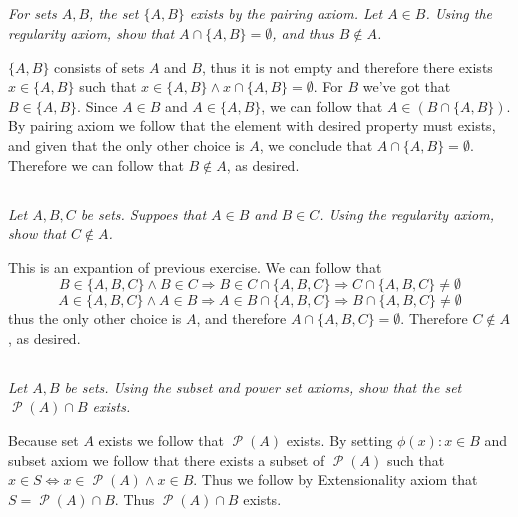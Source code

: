 \documentclass[11pt,oneside,titlepage]{book}
\DeclareMathOperator \pow {\mathcal {P}}
\DeclareMathOperator \lra {\Leftrightarrow}
\DeclareMathOperator \imp {\Rightarrow}
\begin{document}
\subsection{}

\textit{For sets $A, B$, the set $\{A, B\}$ exists by the pairing axiom. Let $A \in B$.
  Using the regularity axiom, show that $A \cap \{A, B\} = \emptyset$, and thus $B \notin A$.}

$\{A, B\}$ consists of sets $A$ and $B$, thus it is not empty and therefore
there exists $x \in \{A, B\}$ such that $x \in \{A, B\} \land x \cap \{A, B\} = \emptyset$.
For $B$ we've got that $B \in \{A, B\}$. Since $A \in B$ and $A \in \{A, B\}$, we can follow that
$A \in (B \cap \{A, B\})$. By pairing axiom we follow that the element with desired
property must exists, and given that the only other choice is $A$,
we conclude that $A \cap \{A, B\} = \emptyset$. Therefore we can follow that $B \notin A$, as
desired.

\subsection{}

\textit{Let $A, B, C$ be sets. Suppoes that $A \in B$ and $B \in C$. Using the regularity axiom,
  show that $C \notin A$.}

This is an expantion of previous exercise. We can follow that
$$B \in \{A, B, C\} \land B \in C \imp B \in C \cap \{A, B, C\} \imp C \cap \{A, B, C\}
\neq \emptyset$$
$$A \in \{A, B, C\} \land A \in B \imp A \in B \cap \{A, B, C\} \imp B \cap \{A, B, C\}
\neq \emptyset$$
thus the only other choice is $A$, and therefore $A \cap  \{A, B, C\} = \emptyset$. Therefore
$C \notin A$, as desired.


\subsection{}

\textit{Let $A, B$ be sets. Using the subset and power set axioms, show that the set
  $\pow(A) \cap B$ exists.}

Because set $A$ exists we follow that $\pow(A)$ exists. By setting $\phi(x): x \in B$ and
subset axiom we follow that there exists a subset of $\pow(A)$ such that
$x \in S \lra x \in \pow(A) \land x \in B$. Thus we follow by Extensionality axiom
that $S = \pow(A) \cap B$. Thus $\pow(A) \cap B$ exists.

\subsection{}
\end{document}
